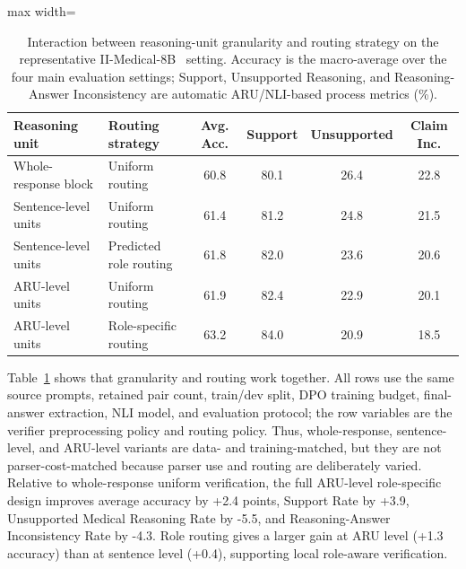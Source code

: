 \documentclass[a4paper,fleqn,doubleblind]{cas-sc}
\begin{document}
\begin{table}[htbp]
    \centering
    \renewcommand{\arraystretch}{1.1}
    \footnotesize
    \caption[Interaction between reasoning-unit granularity and routing.]{Interaction between reasoning-unit granularity and routing strategy on the representative II-Medical-8B~\cite{intelligentinternet2025iimedical8b} setting. Accuracy is the macro-average over the four main evaluation settings; Support, Unsupported Reasoning, and Reasoning-Answer Inconsistency are automatic ARU/NLI-based process metrics (\%).}
    \label{tab:ablation_granularity_routing}
    \begin{adjustbox}{max width=\textwidth}
        \begin{tabular}{llcccc}
            \toprule
            \textbf{Reasoning unit} & \textbf{Routing strategy} & \textbf{Avg. Acc.} & \textbf{Support} & \textbf{Unsupported} & \textbf{Claim Inc.} \\
            \midrule
            Whole-response block & Uniform routing & 60.8 & 80.1 & 26.4 & 22.8 \\
            Sentence-level units & Uniform routing & 61.4 & 81.2 & 24.8 & 21.5 \\
            Sentence-level units & Predicted role routing & 61.8 & 82.0 & 23.6 & 20.6 \\
            ARU-level units & Uniform routing & 61.9 & 82.4 & 22.9 & 20.1 \\
            ARU-level units & Role-specific routing & 63.2 & 84.0 & 20.9 & 18.5 \\
            \bottomrule
        \end{tabular}
    \end{adjustbox}
\end{table}

Table~\ref{tab:ablation_granularity_routing} shows that granularity and routing work together. All rows use the same source prompts, retained pair count, train/dev split, DPO training budget, final-answer extraction, NLI model, and evaluation protocol; the row variables are the verifier preprocessing policy and routing policy. Thus, whole-response, sentence-level, and ARU-level variants are data- and training-matched, but they are not parser-cost-matched because parser use and routing are deliberately varied. Relative to whole-response uniform verification, the full ARU-level role-specific design improves average accuracy by +2.4 points, Support Rate by +3.9, Unsupported Medical Reasoning Rate by -5.5, and Reasoning-Answer Inconsistency Rate by -4.3. Role routing gives a larger gain at ARU level (+1.3 accuracy) than at sentence level (+0.4), supporting local role-aware verification.
\end{document}
